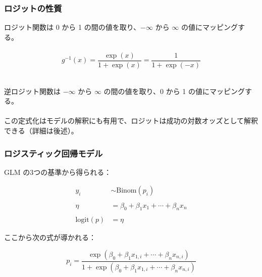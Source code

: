 
\begin{frame}
\frametitle{ロジットの性質}

ロジット関数は 0 から 1 の間の値を取り、$-\infty$ から $\infty$ の値にマッピングする。\\
~\\

{
\[g^{-1}(x) = \frac{\exp(x)}{1+\exp(x)} = \frac{1}{1+\exp(-x)}\]
}

~\\
逆ロジット関数は $-\infty$ から $\infty$ の間の値を取り、0 から 1 の値にマッピングする。\\

~\\
この定式化はモデルの解釈にも有用で、ロジットは成功の対数オッズとして解釈できる（詳細は後述）。


\end{frame}


\begin{frame}
\frametitle{ロジスティック回帰モデル}

GLM の3つの基準から得られる：

\begin{align*}
y_i &\sim \text{Binom}(p_i)\\
\\
\eta &= \beta_0+\beta_1 x_1 + \cdots + \beta_n x_n\\
\\
\text{logit}(p) &= \eta
\end{align*}

ここから次の式が導かれる：

\[ p_i = \frac{\exp(\beta_0+\beta_1 x_{1,i} + \cdots + \beta_n x_{n,i})}{1+\exp(\beta_0+\beta_1 x_{1,i} + \cdots + \beta_n x_{n,i})} \]


\end{frame}


